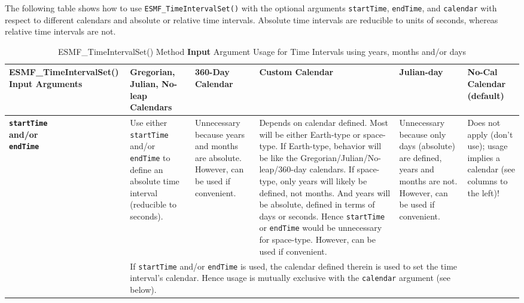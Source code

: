 The following table shows how to use {\tt ESMF\_TimeIntervalSet()} with the optional arguments {\tt startTime}, {\tt endTime}, and {\tt calendar} with respect to different calendars and absolute or relative time intervals.  Absolute time intervals are reducible to units of seconds, whereas relative time intervals are not.
\begin{center}
\begin{table}

\caption{\label{table:timeIntervalSet}ESMF\_TimeIntervalSet() Method {\bf Input} Argument Usage for Time Intervals using years, months and/or days}

\begin{tabular}{|p{1.5in}|p{1.25in}|p{1.25in}|p{1.25in}|p{1.25in}|p{1.25in}|}
\hline

{\bf ESMF\_TimeIntervalSet() Input Arguments} &
  {\bf Gregorian, Julian, No-leap Calendars} &
  {\bf 360-Day Calendar} &
  {\bf Custom Calendar} &
  {\bf Julian-day} &
  {\bf No-Cal Calendar} (default) \\
\hline\hline

{\bf {\tt startTime} \newline
     and/or \newline
     {\tt endTime}} &

  Use either {\tt startTime} and/or {\tt endTime} to define an absolute time interval (reducible to seconds). &

  Unnecessary because years and months are absolute.  However, can be used if convenient. &

  Depends on calendar defined.  Most will be either Earth-type or space-type.  If Earth-type, behavior will be like the Gregorian/Julian/No-leap/360-day calendars.  If space-type, only years will likely be defined, not months.  And years will be absolute, defined in terms of days or seconds.  Hence {\tt startTime} or {\tt endTime} would be unnecessary for space-type.  However, can be used if convenient. &

  Unnecessary because only days (absolute) are defined, years and months are not.  However, can be used if convenient. &

  Does not apply (don't use); usage implies a calendar (see columns to the left)! \\
\cline{2-5}

  & \multicolumn{4}{l}{If {\tt startTime} and/or {\tt endTime} is used, the calendar defined therein is used to set the time interval's calendar.  Hence usage is mutually exclusive with the {\tt calendar} argument (see below).} \\
\hline


\end{tabular}
\end{table}
\end{center}
